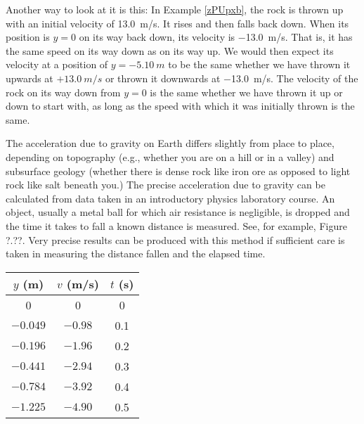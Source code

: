 \documentclass[main-ap-physics.tex]{subfiles}
\begin{document}
\vspace{1em}

Another way to look at it is this: In Example \ref{zPUpxb}, the rock is thrown up with an initial velocity of \SI{13.0}{m/s}. It rises and then falls back down. When its position is $y = 0$ on its way back down, its velocity is \SI{-13.0}{m/s}. That is, it has the same speed on its way down as on its way up. We would then expect its velocity at a position of $y = \SI{-5.10}{m}$ to be the same whether we have thrown it upwards at $+\SI{13.0}{m/s}$ or thrown it downwards at \SI{-13.0}{m/s}. The velocity of the rock on its way down from $y = 0$ is the same whether we have thrown it up or down to start with, as long as the speed with which it was initially thrown is the same.

\endsolution

\begin{example}
    The acceleration due to gravity on Earth differs slightly from place to place, depending on topography (e.g., whether you are on a hill or in a valley) and subsurface geology (whether there is dense rock like iron ore as opposed to light rock like salt beneath you.) The precise acceleration due to gravity can be calculated from data taken in an introductory physics laboratory course. An object, usually a metal ball for which air resistance is negligible, is dropped and the time it takes to fall a known distance is measured. See, for example, Figure ?.??. Very precise results can be produced with this method if sufficient care is taken in measuring the distance fallen and the elapsed time.

    \begin{center}
        \begin{tabular}{c|c|c}
            \textbf{$y$ (m)} & \textbf{$v$ (m/s)}  & \textbf{$t$ (s)}\\ \hline
             0 & 0 & 0\\
             $-0.049$ & $-0.98$ & 0.1\\
             $-0.196$ & $-1.96$ & 0.2\\
             $-0.441$ & $-2.94$ & 0.3\\
             $-0.784$ & $-3.92$ & 0.4\\
             $-1.225$ & $-4.90$ & 0.5 \\ \hline
        \end{tabular}
    \end{center}
\end{example}
\end{document}
